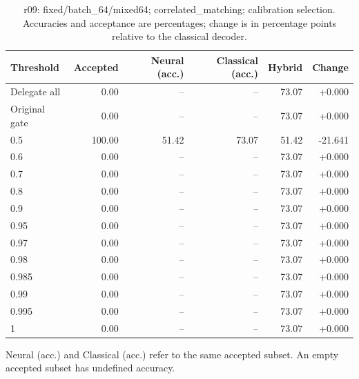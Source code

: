 \begin{table}[htbp]
\centering\small
\setlength{\tabcolsep}{3pt}
\caption{r09: fixed/batch\_64/mixed64; correlated\_matching; calibration selection. Accuracies and acceptance are percentages; change is in percentage points relative to the classical decoder.}
\begin{tabular}{lrrrrr}
\toprule
Threshold & Accepted & Neural (acc.) & Classical (acc.) & Hybrid & Change \\
\midrule
Delegate all & 0.00 & -- & -- & 73.07 & +0.000 \\
Original gate & 0.00 & -- & -- & 73.07 & +0.000 \\
0.5 & 100.00 & 51.42 & 73.07 & 51.42 & -21.641 \\
0.6 & 0.00 & -- & -- & 73.07 & +0.000 \\
0.7 & 0.00 & -- & -- & 73.07 & +0.000 \\
0.8 & 0.00 & -- & -- & 73.07 & +0.000 \\
0.9 & 0.00 & -- & -- & 73.07 & +0.000 \\
0.95 & 0.00 & -- & -- & 73.07 & +0.000 \\
0.97 & 0.00 & -- & -- & 73.07 & +0.000 \\
0.98 & 0.00 & -- & -- & 73.07 & +0.000 \\
0.985 & 0.00 & -- & -- & 73.07 & +0.000 \\
0.99 & 0.00 & -- & -- & 73.07 & +0.000 \\
0.995 & 0.00 & -- & -- & 73.07 & +0.000 \\
1 & 0.00 & -- & -- & 73.07 & +0.000 \\
\bottomrule
\end{tabular}
\par\smallskip\footnotesize Neural (acc.) and Classical (acc.) refer to the same accepted subset. An empty accepted subset has undefined accuracy.
\end{table}
